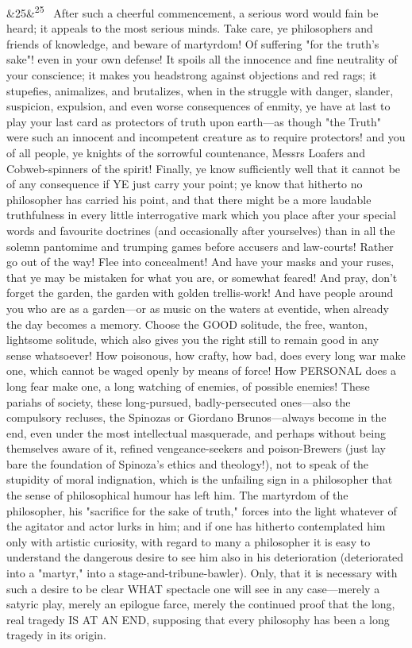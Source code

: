 \documentclass[12pt]{article}
\newcommand{\para}[1][]{\par\noindent\ifx&#1&\else\textsuperscript{\footnotesize #1}~\fi}
\begin{document}
\para[25] After such a cheerful commencement, a serious word would fain be heard; it appeals to the most serious minds. Take care, ye philosophers and friends of knowledge, and beware of martyrdom! Of suffering "for the truth's sake"! even in your own defense! It spoils all the innocence and fine neutrality of your conscience; it makes you headstrong against objections and red rags; it stupefies, animalizes, and brutalizes, when in the struggle with danger, slander, suspicion, expulsion, and even worse consequences of enmity, ye have at last to play your last card as protectors of truth upon earth---as though "the Truth" were such an innocent and incompetent creature as to require protectors! and you of all people, ye knights of the sorrowful countenance, Messrs Loafers and Cobweb-spinners of the spirit! Finally, ye know sufficiently well that it cannot be of any consequence if YE just carry your point; ye know that hitherto no philosopher has carried his point, and that there might be a more laudable truthfulness in every little interrogative mark which you place after your special words and favourite doctrines (and occasionally after yourselves) than in all the solemn pantomime and trumping games before accusers and law-courts! Rather go out of the way! Flee into concealment! And have your masks and your ruses, that ye may be mistaken for what you are, or somewhat feared! And pray, don't forget the garden, the garden with golden trellis-work! And have people around you who are as a garden---or as music on the waters at eventide, when already the day becomes a memory. Choose the GOOD solitude, the free, wanton, lightsome solitude, which also gives you the right still to remain good in any sense whatsoever! How poisonous, how crafty, how bad, does every long war make one, which cannot be waged openly by means of force! How PERSONAL does a long fear make one, a long watching of enemies, of possible enemies! These pariahs of society, these long-pursued, badly-persecuted ones---also the compulsory recluses, the Spinozas or Giordano Brunos---always become in the end, even under the most intellectual masquerade, and perhaps without being themselves aware of it, refined vengeance-seekers and poison-Brewers (just lay bare the foundation of Spinoza's ethics and theology!), not to speak of the stupidity of moral indignation, which is the unfailing sign in a philosopher that the sense of philosophical humour has left him. The martyrdom of the philosopher, his "sacrifice for the sake of truth," forces into the light whatever of the agitator and actor lurks in him; and if one has hitherto contemplated him only with artistic curiosity, with regard to many a philosopher it is easy to understand the dangerous desire to see him also in his deterioration (deteriorated into a "martyr," into a stage-and-tribune-bawler). Only, that it is necessary with such a desire to be clear WHAT spectacle one will see in any case---merely a satyric play, merely an epilogue farce, merely the continued proof that the long, real tragedy IS AT AN END, supposing that every philosophy has been a long tragedy in its origin.
\end{document}
